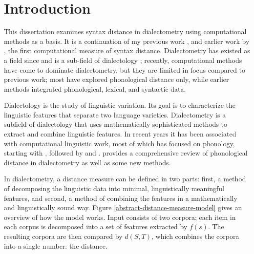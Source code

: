 \chapter{Introduction}
This dissertation examines syntax distance in dialectometry using
computational methods as a basis. It is a continuation of my previous
work \cite{sanders07}, \cite{sanders08b} and earlier work by
, the first computational measure of syntax
distance. Dialectometry has existed as a field since
 and is a sub-field of dialectology
\cite{chambers98}; recently, computational methods have come to
dominate dialectometry, but they are limited in focus compared to
previous work; most have explored phonological distance only, while
earlier methods integrated phonological, lexical, and syntactic data.

Dialectology is the study of linguistic variation. %
Its goal is to characterize the linguistic features that
separate two language varieties. Dialectometry is a subfield of
dialectology that uses mathematically sophisticated methods to extract
and combine linguistic features. In recent years it has
been associated with computational linguistic work, most of which
has focused on phonology, starting with
, followed by  and
.  provides a comprehensive
review of phonological distance in dialectometry as well as some new
methods.

In dialectometry, a distance measure can be defined in two parts:
first, a method of decomposing the linguistic data into minimal,
linguistically meaningful features, and second, a method of combining
the features in a mathematically and linguistically sound way. Figure
\ref{abstract-distance-measure-model} gives an overview of how the
model works. Input consists of two corpora; each item in each corpus
is decomposed into a set of features extracted by $f(s)$. The
resulting corpora are then compared by $d(S,T)$, which combines the
corpora into a single number: the distance.

